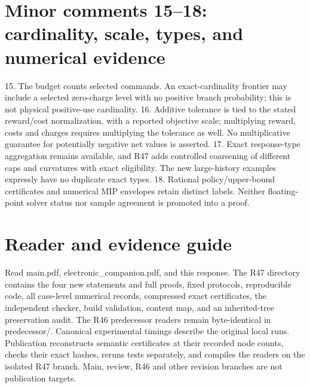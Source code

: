 \documentclass[11pt]{article}
\begin{document}
\section*{Minor comments 15--18: cardinality, scale, types, and numerical evidence}
15. The budget counts selected commands. An exact-cardinality frontier may include a selected zero-charge level with no positive branch probability; this is not physical positive-use cardinality. 16. Additive tolerance is tied to the stated reward/cost normalization, with a reported objective scale; multiplying reward, costs and charges requires multiplying the tolerance as well. No multiplicative guarantee for potentially negative net values is asserted. 17. Exact response-type aggregation remains available, and R47 adds controlled coarsening of different caps and curvatures with exact eligibility. The new large-history examples expressly have no duplicate exact types. 18. Rational policy/upper-bound certificates and numerical MIP envelopes retain distinct labels. Neither floating-point solver status nor sample agreement is promoted into a proof.

\section*{Reader and evidence guide}
Read main.pdf, electronic\_companion.pdf, and this response. The R47 directory contains the four new statements and full proofs, fixed protocols, reproducible code, all case-level numerical records, compressed exact certificates, the independent checker, build validation, content map, and an inherited-tree preservation audit. The R46 predecessor readers remain byte-identical in predecessor/. Canonical experimental timings describe the original local runs. Publication reconstructs semantic certificates at their recorded node counts, checks their exact hashes, reruns tests separately, and compiles the readers on the isolated R47 branch. Main, review, R46 and other revision branches are not publication targets.
\end{document}
